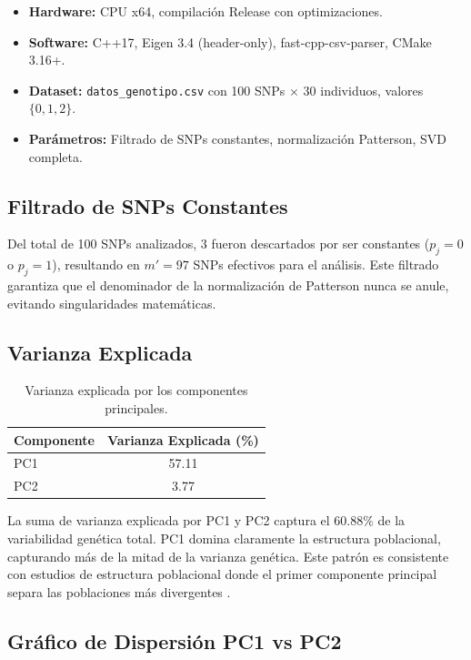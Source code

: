 \documentclass[12pt,a4paper]{article}
\theoremstyle{definition}
\begin{document}
\begin{itemize}
    \item \textbf{Hardware:} CPU x64, compilaci\'{o}n Release con optimizaciones.
    \item \textbf{Software:} C++17, Eigen 3.4 (header-only), fast-cpp-csv-parser, CMake 3.16+.
    \item \textbf{Dataset:} \texttt{datos\_genotipo.csv} con 100 SNPs $\times$ 30 individuos, valores $\{0,1,2\}$.
    \item \textbf{Par\'{a}metros:} Filtrado de SNPs constantes, normalizaci\'{o}n Patterson, SVD completa.
\end{itemize}

\subsection{Filtrado de SNPs Constantes}

Del total de 100 SNPs analizados, 3 fueron descartados por ser constantes ($p_j = 0$ o $p_j = 1$), resultando en $m' = 97$ SNPs efectivos para el an\'{a}lisis. Este filtrado garantiza que el denominador de la normalizaci\'{o}n de Patterson nunca se anule, evitando singularidades matem\'{a}ticas.

\subsection{Varianza Explicada}

\begin{table}[H]
\centering
\caption{Varianza explicada por los componentes principales.}
\label{tab:varianza}
\begin{tabular}{@{}lc@{}}
\toprule
\textbf{Componente} & \textbf{Varianza Explicada (\%)} \\ \midrule
PC1 & 57.11 \\
PC2 & 3.77 \\ \bottomrule
\end{tabular}
\end{table}

La suma de varianza explicada por PC1 y PC2 captura el $60.88\%$ de la variabilidad gen\'{e}tica total. PC1 domina claramente la estructura poblacional, capturando m\'{a}s de la mitad de la varianza gen\'{e}tica. Este patr\'{o}n es consistente con estudios de estructura poblacional donde el primer componente principal separa las poblaciones m\'{a}s divergentes \cite{patterson2006}.

\subsection{Gr\'{a}fico de Dispersi\'{o}n PC1 vs PC2}
\end{document}
